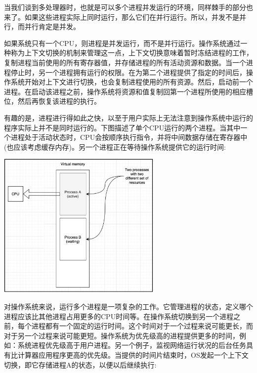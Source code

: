 当我们谈到多处理器时，也就是可以多个进程并发运行的环境，同样棘手的部分也来了。如果这些进程实际上同时运行，那么它们在并行运行。所以，并发不是并行，而并行肯定是并发。 \par
如果系统只有一个CPU，则进程是并发运行，而不是并行运行。操作系统通过一种称为上下文切换的机制来管理这一点，上下文切换意味着暂时冻结进程的工作，复制进程当前使用的所有寄存器值，并存储进程的所有活动资源和数据。当一个进程停止时，另一个进程拥有运行的权限。在为第二个进程提供了指定的时间后，操作系统开始对上下文进行切换，也会复制进程使用的所有资源。然后，启动前一个进程。在启动该进程之前，操作系统将资源和值复制回第一个进程所使用的相应槽位，然后再恢复该进程的执行。 \par
有趣的是，进程进行得如此之快，以至于用户实际上无法注意到操作系统中运行的程序实际上并不是同时运行的。下图描述了单个CPU运行的两个进程。当其中一个进程处于活动状态时，CPU会按顺序执行指令，并将中间数据存储在寄存器中(也应该考虑缓存内存)。另一个进程正在等待操作系统提供它的运行时间: \par

\begin{center}
	\includegraphics[width=0.6\textwidth]{content/Section-2/Chapter-8/3}
\end{center}

对操作系统来说，运行多个进程是一项复杂的工作。它管理进程的状态，定义哪个进程应该比其他进程占用更多的CPU时间等。在操作系统切换到另一个进程之前，每个进程都有一个固定的运行时间。这个时间对于一个过程来说可能更长，而对于另一个过程来说可能更短。操作系统为优先级高的进程提供更多的时间，例如：系统进程优先级高于用户进程。另一个例子，监视网络运行状况的后台任务具有比计算器应用程序更高的优先级。当提供的时间片结束时，OS发起一个上下文切换，即它存储进程A的状态，以便以后继续执行: \par

